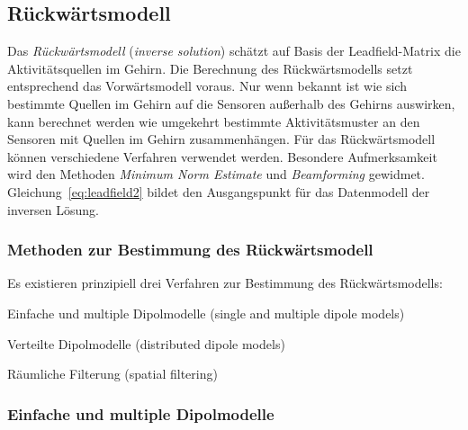 \documentclass[doc,a4paper,12pt]{apa6}
\begin{document}


\subsection{Rückwärtsmodell}

Das \emph{Rückwärtsmodell} (\emph{inverse solution}) schätzt auf Basis der Leadfield-Matrix die Aktivitätsquellen im Gehirn. Die Berechnung des Rückwärtsmodells setzt entsprechend das Vorwärtsmodell voraus. Nur wenn bekannt ist wie sich bestimmte Quellen im Gehirn auf die Sensoren außerhalb des Gehirns auswirken, kann berechnet werden wie umgekehrt bestimmte Aktivitätsmuster an den Sensoren mit Quellen im Gehirn zusammenhängen. Für das Rückwärtsmodell können verschiedene Verfahren verwendet werden. Besondere Aufmerksamkeit wird den Methoden \emph{Minimum Norm Estimate} und \emph{Beamforming} gewidmet. Gleichung~\ref{eq:leadfield2} bildet den Ausgangspunkt für das Datenmodell der inversen Lösung.

\subsubsection{Methoden zur Bestimmung des Rückwärtsmodell}

Es existieren prinzipiell drei Verfahren zur Bestimmung des Rückwärtsmodells:

\begin{compactitem}
\item Einfache und multiple Dipolmodelle (single and multiple dipole models)
\item Verteilte Dipolmodelle (distributed dipole models)
\item Räumliche Filterung (spatial filtering)
\end{compactitem}

\subsubsection{Einfache und multiple Dipolmodelle}
\end{document}
